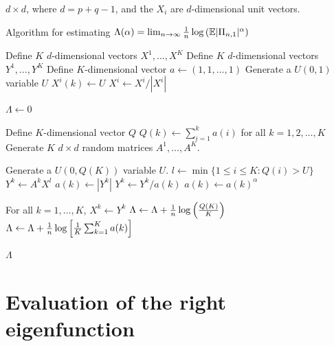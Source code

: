 $d \times d$, where $d = p + q - 1$, and the $X_i$ are $d$-dimensional
unit vectors. 
\begin{algorithm}[H]
  \caption{Algorithm for estimating
    $\Lambda(\alpha) = \lim_{n \to \infty} {1 \over n} \log\left(\mathbb{E} |\Pi_{n, 1}|^\alpha \right)$}
  \label{alg:Lambda_estimation}
  \begin{algorithmic}
    \State Define $K$ $d$-dimensional vectors $X^1, \dots, X^K$
    \State Define $K$ $d$-dimensional vectors $Y^1, \dots, Y^K$
    \State Define $K$-dimensional vector $a \gets (1, 1, \dots, 1)$
    \State Generate a $U(0, 1)$ variable $U$
    \State $X^i(k) \gets U$ 
    \EndFor
    \State $X^i \gets X^i/|X^i|$
    \EndFor

    $\Lambda \gets 0$


    \State Define $K$-dimensional vector $Q$
    \State $Q(k) \gets \sum_{i=1}^k a(i)$ for all $k=1,2,\dots, K$
    \State Generate $K$ $d \times d$ random matrices $A^1, \dots, A^K$.

    \State Generate a $U(0, Q(K))$ variable $U$.
    \State $l \gets \min\{1 \leq i \leq K: Q(i) > U\}$
    \State $Y^k \gets A^k X^l$
    \State $a(k) \gets |Y^k|$
    \State $Y^k \gets Y^k/a(k)$
    \State $a(k) \gets a(k)^\alpha$
    \EndFor

    \State For all $k=1,\dots,K$, $X^k \gets Y^k$
    \State $\Lambda \gets \Lambda + {1 \over n}\log\left( { Q(K) \over K} \right)$
    \EndFor
    \State $\Lambda \gets \Lambda + {1 \over n}\log\left[ {1 \over K}\sum_{k=1}^K a(k) \right]$

    \Return $\Lambda$
    \EndProcedure
  \end{algorithmic}
\end{algorithm}


\section{Evaluation of the right eigenfunction}

